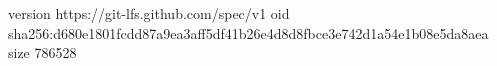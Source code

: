 version https://git-lfs.github.com/spec/v1
oid sha256:d680e1801fcdd87a9ea3aff5df41b26e4d8d8fbce3e742d1a54e1b08e5da8aea
size 786528

